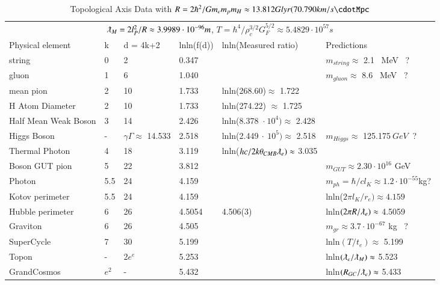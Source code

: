 \documentclass[twoside,draft]{article}
\begin{document}
\begin{sloppypar}
\begin{table}
 \caption{Topological Axis Data with $R = 2\hbar^2/Gm_em_pm_H \approx 13.812 Glyr(70.790 km/s\cdotMpc$} 
  \centering
  \begin{tabular}{llllll}
    \toprule
    \multicolumn{6}{c}{$\lambdabar_M = 2l_P^2/R \approx 3.9989\cdot10^{-96} m$, $T = \hbar^{4} /\rho_{c}^{3/2} G_{F}^{5/2} \approx 5.4829 \cdot 10^{57} s$}                   \\
    \cmidrule(r){1-6}
   Physical element     & k     & d = 4k+2 & lnln(f(d)) & lnln(Measured ratio)\cite{Tanabashi} & Predictions \\
    \midrule
    string & 0  & 2 & 0.347 &  & $ m_{string} \approx$ 2.1~ MeV ~? \\
    gluon  & 1 & 6 & 1.040 &  & $m_{gluon} \approx$ 8.6~ MeV ~? \\  
    mean pion & 2  & 10 & 1.733 & lnln(268.60)$\approx$ 1.722 &  \\ 
    H Atom Diameter & 2  & 10 & 1.733 & lnln(274.22) $\approx$ 1.725  &  \\
    Half Mean Weak Boson & 3  & 14 & 2.426 & lnln(8.378~$\cdot~10^4)\approx$ 2.428  &   \\
    Higgs Boson & - & $\gamma\Gamma \approx$ 14.533 & 2.518 &lnln(2.449$~\cdot~10^5)\approx$ 2.518& $m_{Higgs} \approx$ 125.175$~ GeV ~$ ? \\ 
    Thermal Photon & 4  & 18 & 3.119 & lnln($hc/2k\theta_{CMB}\lambdabar_e) \approx$ 3.035 &  \\
    Boson GUT pion & 5  & 22 & 3.812 & & $m_{GUT} \approx 2.30\cdot 10^{16}$ GeV \\
    Photon & 5.5  & 24 & 4.159 & & $m_{ph} = \hbar/cl_K \approx 1.2\cdot 10^{-55}$kg? \\
    Kotov perimeter & 5.5  & 24 & 4.159 & & lnln($2\pi l_K /r_e)\approx 4.159$ \\
    Hubble perimeter & 6  & 26 & 4.5054 & 4.506(3)\cite{Bonvin} & lnln$(2\pi R /\lambdabar_e)\approx$ 4.5059  \\
    Graviton & 6  & 26 & 4.505 &  & $ m_{gr} \approx 3.7\cdot 10^{-67}$ kg ~? \\
    SuperCycle & 7  & 30 & 5.199 & & lnln$(T/t_e) \approx$ 5.199 \\
    Topon & - & 2$e^e$ & 5.253 &  & lnln$(\lambdabar_e/\lambdabar_M) \approx$ 5.523 \\
    GrandCosmos & $e^2$  & - & 5.432 & & lnln$(R_{GC}/\lambdabar_e)\approx$ 5.433  \\
    \bottomrule
  \end{tabular}
  \label{tab:table}
\end{table}









\end{sloppypar}
\end{document}
